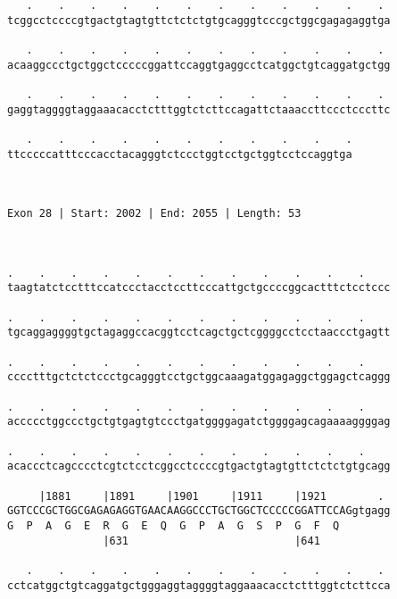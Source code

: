 \documentclass{article}
\begin{document}
\begin{Verbatim}
   .    .    .    .    .    .    .    .    .    .    .    . 
tcggcctccccgtgactgtagtgttctctctgtgcagggtcccgctggcgagagaggtga
                                                            
   .    .    .    .    .    .    .    .    .    .    .    . 
acaaggccctgctggctcccccggattccaggtgaggcctcatggctgtcaggatgctgg
                                                            
   .    .    .    .    .    .    .    .    .    .    .    . 
gaggtaggggtaggaaacacctctttggtctcttccagattctaaaccttccctcccttc
                                                            
   .    .    .    .    .    .    .    .    .    .    .
ttcccccatttcccacctacagggtctccctggtcctgctggtcctccaggtga
                                                      
                                                      
 
Exon 28 | Start: 2002 | End: 2055 | Length: 53



.    .    .    .    .    .    .    .    .    .    .    .    
taagtatctcctttccatccctacctccttcccattgctgccccggcactttctcctccc
                                                            
.    .    .    .    .    .    .    .    .    .    .    .    
tgcaggaggggtgctagaggccacggtcctcagctgctcggggcctcctaaccctgagtt
                                                            
.    .    .    .    .    .    .    .    .    .    .    .    
cccctttgctctctccctgcagggtcctgctggcaaagatggagaggctggagctcaggg
                                                            
.    .    .    .    .    .    .    .    .    .    .    .    
accccctggccctgctgtgagtgtccctgatggggagatctggggagcagaaaaggggag
                                                            
.    .    .    .    .    .    .    .    .    .    .    .    
acaccctcagcccctcgtctcctcggcctccccgtgactgtagtgttctctctgtgcagg
                                                            
     |1881     |1891     |1901     |1911     |1921        . 
GGTCCCGCTGGCGAGAGAGGTGAACAAGGCCCTGCTGGCTCCCCCGGATTCCAGgtgagg
G  P  A  G  E  R  G  E  Q  G  P  A  G  S  P  G  F  Q        
               |631                          |641           
  
   .    .    .    .    .    .    .    .    .    .    .    . 
cctcatggctgtcaggatgctgggaggtaggggtaggaaacacctctttggtctcttcca
                                                            

\end{Verbatim}
\end{document}
